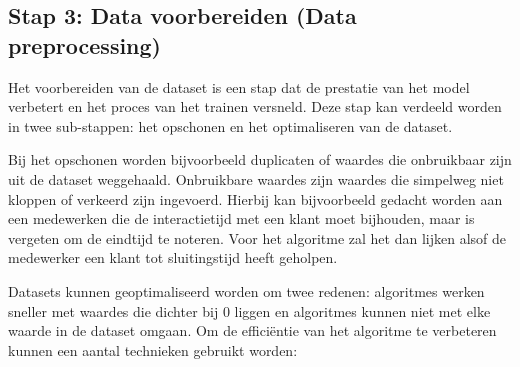 
\subsection{Stap 3: Data voorbereiden (Data preprocessing)}\label{subsec:ch4-data-voorbereiden}
Het voorbereiden van de dataset is een stap dat de prestatie van het model verbetert en het proces van het trainen versneld. Deze stap kan verdeeld worden in twee sub-stappen: het opschonen en het optimaliseren van de dataset.

Bij het opschonen worden bijvoorbeeld duplicaten of waardes die onbruikbaar zijn uit de dataset weggehaald. Onbruikbare waardes zijn waardes die simpelweg niet kloppen of verkeerd zijn ingevoerd. Hierbij kan bijvoorbeeld gedacht worden aan een medewerken die de interactietijd met een klant moet bijhouden, maar is vergeten om de eindtijd te noteren. Voor het algoritme zal het dan lijken alsof de medewerker een klant tot sluitingstijd heeft geholpen.

Datasets kunnen geoptimaliseerd worden om twee redenen: algoritmes werken sneller met waardes die dichter bij \(0\) liggen en algoritmes kunnen niet met elke waarde in de dataset omgaan. Om de efficiëntie van het algoritme te verbeteren kunnen een aantal technieken gebruikt worden:

